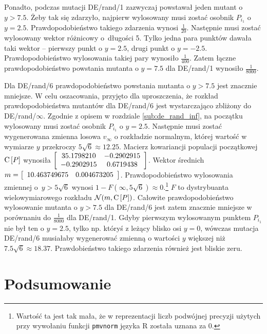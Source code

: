 \documentclass[a4paper,onecolumn,oneside,11pt,wide,floatssmall]{mwrep}
\def\C{{\rm C}\,}
\theoremstyle{definition}
\theoremstyle{plain}%
\theoremstyle{remark}
\begin{document}
Ponadto, podczas mutacji DE/rand/1 zazwyczaj powstawał jeden mutant o $y > 7.5$. 
Żeby tak się zdarzyło, najpierw wylosowany musi zostać osobnik $P_{i_1}$ o $y = 2.5$.
Prawdopodobieństwo takiego zdarzenia wynosi $\frac{1}{20}$.
Następnie musi zostać wylosowany wektor różnicowy o~długości 5. Tylko jedna para punktów 
dawała taki wektor --
pierwszy punkt o $y = 2.5$, drugi punkt o $y = -2.5$. 
Prawdopodobieństwo wylosowania takiej pary wynosiło $\frac{1}{400}$. 
Zatem łączne prawdopodobieństwo powstania mutanta o
$y = 7.5$ dla DE/rand/1 wynosiło $\frac{1}{8000}$. 

Dla DE/rand/6 prawdopodobieństwo powstania mutanta o $y > 7.5$ jest znacznie mniejsze.
W celu oszacowania, przyjęto dla uproszczenia, że rozkład prawdopodobieństwa mutantów dla
DE/rand/6 jest wystarczająco zbliżony do DE/rand/$\infty$.
Zgodnie z opisem w rozdziale \ref{sub:de_rand_inf}, na początku wylosowany musi zostać osobnik 
$P_{i_1}$ o $y = 2.5$. Następnie musi zostać wygenerowana zmienna losowa 
$v_\infty$ o rozkładzie normalnym, której wartość w wymiarze $y$
przekroczy $5\sqrt{6} \approx 12.25$. Macierz kowariancji populacji początkowej  
$\C[P]$ wynosiła $\left[ \begin{array}{ c c }
  35.1798210 & -0.2902915 \\
  -0.2902915 &  0.6719438
\end{array} \right]$.
Wektor średnich~$m=\left[ \begin{array}{ c c } 10.463749675 & 0.004673205 \end{array} \right]$.
Prawdopodobieństwo wylosowania zmiennej o~$y > 5\sqrt{6}$ wynosi 
$1 - F(\infty, 5\sqrt{6}) \approx 0$.\footnote{Wartość ta jest tak mała,
że w reprezentacji liczb podwójnej precyzji użytych przy wywołaniu funkcji \texttt{pmvnorm} języka R
została uznana za 0.} $F$ to
dystrybuanta wielowymiarowego rozkładu $\mathcal{N}(m, \C[P])$.
Całowite prawdopodobieństwo wylosowanie mutanta o $y > 7.5$ dla DE/rand/6 jest zatem 
znacznie mniejsze w porównaniu do
$\frac{1}{8000}$ dla DE/rand/1.
Gdyby pierwszym wylosowanym punktem $P_{i_1}$ nie był ten o $y = 2.5$, tylko np. któryś 
z leżący blisko osi $y = 0$, wówczas mutacja DE/rand/6 musiałaby wygenerować zmienną
o wartości $y$ większej niż $7.5\sqrt{6} \approx 18.37$. 
Prawdobieństwo takiego zdarzenia również jest bliskie zeru.

\chapter{Podsumowanie}
\end{document}
